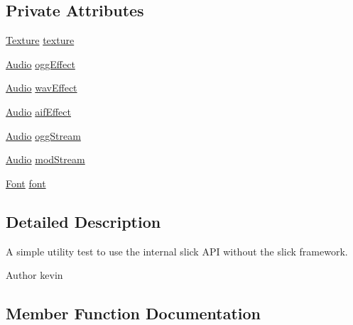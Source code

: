 \subsection*{Private Attributes}
\begin{DoxyCompactItemize}
\item 
\mbox{\hyperlink{interfaceorg_1_1newdawn_1_1slick_1_1opengl_1_1_texture}{Texture}} \mbox{\hyperlink{classorg_1_1newdawn_1_1slick_1_1tests_1_1_test_utils_afc788f996bdde4e06aba401024783347}{texture}}
\item 
\mbox{\hyperlink{interfaceorg_1_1newdawn_1_1slick_1_1openal_1_1_audio}{Audio}} \mbox{\hyperlink{classorg_1_1newdawn_1_1slick_1_1tests_1_1_test_utils_a4f17a6703add4a5d30e064fb32d69a34}{ogg\+Effect}}
\item 
\mbox{\hyperlink{interfaceorg_1_1newdawn_1_1slick_1_1openal_1_1_audio}{Audio}} \mbox{\hyperlink{classorg_1_1newdawn_1_1slick_1_1tests_1_1_test_utils_a1b40069da828fdd5131e127a1db4e1f3}{wav\+Effect}}
\item 
\mbox{\hyperlink{interfaceorg_1_1newdawn_1_1slick_1_1openal_1_1_audio}{Audio}} \mbox{\hyperlink{classorg_1_1newdawn_1_1slick_1_1tests_1_1_test_utils_af8f2ad43fbdbdc89b483f080da4ded88}{aif\+Effect}}
\item 
\mbox{\hyperlink{interfaceorg_1_1newdawn_1_1slick_1_1openal_1_1_audio}{Audio}} \mbox{\hyperlink{classorg_1_1newdawn_1_1slick_1_1tests_1_1_test_utils_a7ea74d87f68b8c8b5e34936b51baf0b8}{ogg\+Stream}}
\item 
\mbox{\hyperlink{interfaceorg_1_1newdawn_1_1slick_1_1openal_1_1_audio}{Audio}} \mbox{\hyperlink{classorg_1_1newdawn_1_1slick_1_1tests_1_1_test_utils_a976c40b2829c394a1bdead2aac1125a4}{mod\+Stream}}
\item 
\mbox{\hyperlink{interfaceorg_1_1newdawn_1_1slick_1_1_font}{Font}} \mbox{\hyperlink{classorg_1_1newdawn_1_1slick_1_1tests_1_1_test_utils_aabeb51946c510a7c4c82d367a6030b34}{font}}
\end{DoxyCompactItemize}


\subsection{Detailed Description}
A simple utility test to use the internal slick A\+PI without the slick framework.

\begin{DoxyAuthor}{Author}
kevin 
\end{DoxyAuthor}


\subsection{Member Function Documentation}
\mbox{\label{classorg_1_1newdawn_1_1slick_1_1tests_1_1_test_utils_ac7ed064f8a58185047e1ef6870382747}} 
